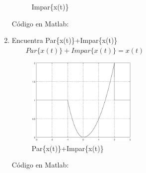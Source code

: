 \documentclass[10pt,a4paper]{report}
\begin{document}
\begin{enumerate}
\begin{figure}[H]
\begin{center}
    \caption{Impar\{x(t)\}}
    \label{fig:Impar}
  \end{center}
\end{figure}
Código en Matlab:
    
\item Encuentra Par\{x(t)\}+Impar\{x(t)\}
$\qquad Par\{x(t)\}+Impar\{x(t)\} = x(t)$
\begin{figure}[H]
  \begin{center}
    \includegraphics[width=0.5\textwidth]{./Ejercicio3/ParImpar}
    \caption{Par\{x(t)\}+Impar\{x(t)\}}
    \label{fig:ParImpar}
  \end{center}
\end{figure}
Código en Matlab:
    
\end{enumerate}
\end{document}
